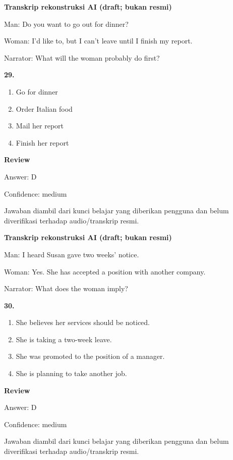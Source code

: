 \documentclass[12pt]{article}
\begin{document}
\vspace{0.25\baselineskip}
\begin{exampleblock}
\textbf{Transkrip rekonstruksi AI (draft; bukan resmi)}\par
Man: Do you want to go out for dinner?\par
Woman: I'd like to, but I can't leave until I finish my report.\par
Narrator: What will the woman probably do first?\par
\end{exampleblock}
\noindent\textbf{29.}
\begin{enumerate}[label=(\Alph*),leftmargin=*,itemsep=0.2em]
\item Go for dinner
\item Order Italian food
\item Mail her report
\item Finish her report
\end{enumerate}
\par
\begingroup
\setlength{\parskip}{0pt}
\setlength{\parindent}{0pt}
\textbf{Review}\par
Answer: D\par
Confidence: medium\par
Jawaban diambil dari kunci belajar yang diberikan pengguna dan belum diverifikasi terhadap audio/transkrip resmi.\par
\endgroup
\par
\vspace{0.25\baselineskip}
\begin{exampleblock}
\textbf{Transkrip rekonstruksi AI (draft; bukan resmi)}\par
Man: I heard Susan gave two weeks' notice.\par
Woman: Yes. She has accepted a position with another company.\par
Narrator: What does the woman imply?\par
\end{exampleblock}
\noindent\textbf{30.}
\begin{enumerate}[label=(\Alph*),leftmargin=*,itemsep=0.2em]
\item She believes her services should be noticed.
\item She is taking a two-week leave.
\item She was promoted to the position of a manager.
\item She is planning to take another job.
\end{enumerate}
\par
\begingroup
\setlength{\parskip}{0pt}
\setlength{\parindent}{0pt}
\textbf{Review}\par
Answer: D\par
Confidence: medium\par
Jawaban diambil dari kunci belajar yang diberikan pengguna dan belum diverifikasi terhadap audio/transkrip resmi.\par
\endgroup
\par
\vspace{0.25\baselineskip}
\end{document}
